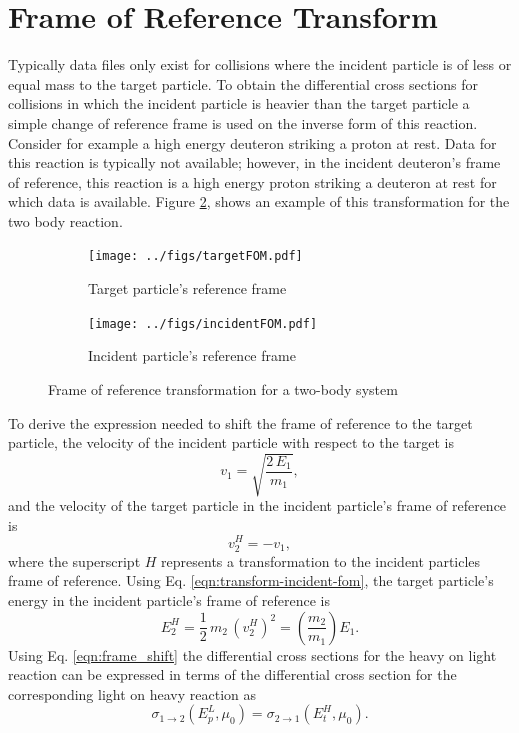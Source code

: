 \documentclass[../main.tex]{subfiles}
\begin{document}
\section{Frame of Reference Transform}
Typically data files only exist for collisions where the incident particle is of less or equal mass to the target particle. To obtain the differential cross sections for collisions in which the incident particle is heavier than the target particle a simple change of reference frame is used on the inverse form of this reaction. Consider for example a high energy deuteron striking a proton at rest. Data for this reaction is typically not available; however, in the incident deuteron's frame of reference, this reaction is a high energy proton striking a deuteron at rest for which data is available. Figure \ref{fig:heavy_collisions}, shows an example of this transformation for the two body reaction.
\begin{figure}[!htb]
  \centering
  \begin{subfigure}{.45\textwidth}
    \centering
    \texttt{[image: ../figs/targetFOM.pdf]}
    \caption{Target particle's reference frame}
  \end{subfigure}%
  \begin{subfigure}{.45\textwidth}
    \centering
    \texttt{[image: ../figs/incidentFOM.pdf]}
    \caption{Incident particle's reference frame}
    \label{fig:sub2}
  \end{subfigure}
  \caption{Frame of reference transformation for a two-body system}
  \label{fig:heavy_collisions}
\end{figure}

To derive the expression needed to shift the frame of reference to the target particle, the velocity of the incident particle with respect to the target is
\begin{equation}
    v_1 = \sqrt{\dfrac{2 \, E_1}{m_1}},
\end{equation}
and the velocity of the target particle in the incident particle's frame of reference is
\begin{equation} \label{eqn:transform-incident-fom}
    v_2^H = -v_1,
\end{equation}
where the superscript $H$ represents a transformation to the incident particles frame of reference. Using Eq. \eqref{eqn:transform-incident-fom}, the target particle's energy in the incident particle's frame of reference is
\begin{equation} \label{eqn:frame_shift}
    E_2^H = \dfrac{1}{2} \, m_2 \, (v_2^H)^2 = \left( \dfrac{m_2}{m_1} \right) E_1.
\end{equation}
Using Eq. \ref{eqn:frame_shift} the differential cross sections for the heavy on light reaction can be expressed in terms of the differential cross section for the corresponding light on heavy reaction as
\begin{equation}
  \sigma_{1 \rightarrow 2}(E_p^L,\mu_0) = \sigma_{2 \rightarrow 1}(E_t^H,\mu_0).
\end{equation}
\end{document}
